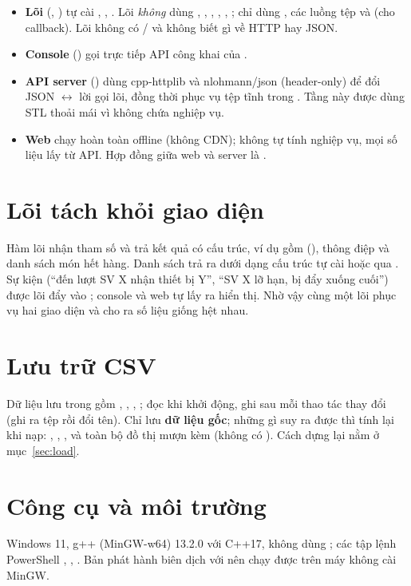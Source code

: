 \begin{itemize}
  \item \textbf{Lõi} (, ) tự cài , , . Lõi \emph{không} dùng , , , , , ; chỉ dùng , các luồng tệp và  (cho callback). Lõi không có / và không biết gì về HTTP hay JSON.
  \item \textbf{Console} () gọi trực tiếp API công khai của .
  \item \textbf{API server} () dùng cpp-httplib và nlohmann/json (header-only) để đổi JSON $\leftrightarrow$ lời gọi lõi, đồng thời phục vụ tệp tĩnh trong . Tầng này được dùng STL thoải mái vì không chứa nghiệp vụ.
  \item \textbf{Web} chạy hoàn toàn offline (không CDN); không tự tính nghiệp vụ, mọi số liệu lấy từ API. Hợp đồng giữa web và server là .
\end{itemize}

\section{Lõi tách khỏi giao diện}
Hàm lõi nhận tham số và trả kết quả có cấu trúc, ví dụ  gồm  (), thông điệp và danh sách món hết hàng. Danh sách trả ra dưới dạng cấu trúc tự cài hoặc qua . Sự kiện (``đến lượt SV X nhận thiết bị Y'', ``SV X lỡ hạn, bị đẩy xuống cuối'') được lõi đẩy vào ; console và web tự lấy ra hiển thị. Nhờ vậy cùng một lõi phục vụ hai giao diện và cho ra số liệu giống hệt nhau.

\section{Lưu trữ CSV}
Dữ liệu lưu trong  gồm , , , ; đọc khi khởi động, ghi sau mỗi thao tác thay đổi (ghi ra tệp  rồi đổi tên). Chỉ lưu \textbf{dữ liệu gốc}; những gì suy ra được thì tính lại khi nạp: , , ,  và toàn bộ đồ thị mượn kèm (không có ). Cách dựng lại nằm ở mục~\ref{sec:load}.

\section{Công cụ và môi trường}
Windows 11, g++ (MinGW-w64) 13.2.0 với C++17, không dùng ; các tập lệnh PowerShell , , . Bản phát hành biên dịch với  nên chạy được trên máy không cài MinGW.
